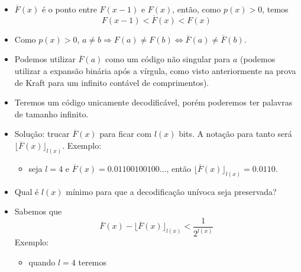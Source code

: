 \begin{frame}[allowframebreaks]
  \begin{itemize}
  \item $\overline{F}(x)$ é o ponto entre $F(x-1)$ e $F(x)$, então, como $p(x)>0$, temos
	\begin{equation}
	F(x-1) < \overline{F}(x) < F(x)
	\end{equation}
  \item Como $p(x)>0$, $a \neq b \Rightarrow F(a) \neq F(b) \Leftrightarrow \overline{F}(a) \neq \overline{F}(b)$.
  \item Podemos utilizar $\overline{F}(a)$ como um código não singular para $a$ (podemos utilizar a expansão binária após a vírgula,
	como visto anteriormente na prova de Kraft para um infinito contável de comprimentos).
  \item Teremos um código unicamente decodificável, porém poderemos ter palavras de tamanho infinito.
  \item Solução: trucar $\overline{F}(x)$ para ficar com $l(x)$ bits. A notação para tanto será $\lfloor \overline{F}(x) \rfloor_{l(x)}$.
	Exemplo:
	\begin{itemize}
	\item seja $l=4$ e $\overline{F}(x) = 0.01100100100\ldots$, então $\lfloor \overline{F}(x) \rfloor_{l(x)} = 0.0110$.
	\end{itemize}
  \item Qual é $l(x)$ mínimo para que a decodificação unívoca seja preservada?
  \item Sabemos que
	\begin{equation}
	\overline{F}(x) - \lfloor \overline{F}(x) \rfloor_{l(x)} < \frac{1}{2^{l(x)}}
	\end{equation}
	Exemplo:
	\begin{itemize}
        \item quando $l=4$ teremos \\
	\end{itemize}


\end{itemize}
\end{frame}
